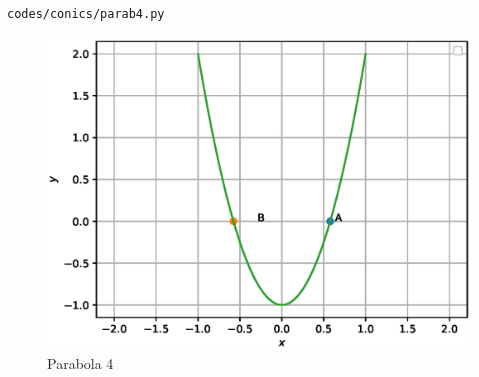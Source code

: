 \begin{enumerate}[label=\arabic*.,ref=\thesubsubsection.\theenumi]
\begin{lstlisting}
codes/conics/parab4.py
\end{lstlisting}
\begin{figure}[!ht]
\includegraphics[width=\columnwidth]{./figs/conics/parabola4.eps}
\caption{Parabola 4}
\label{fig:parab4}
\end{figure}


\end{enumerate}